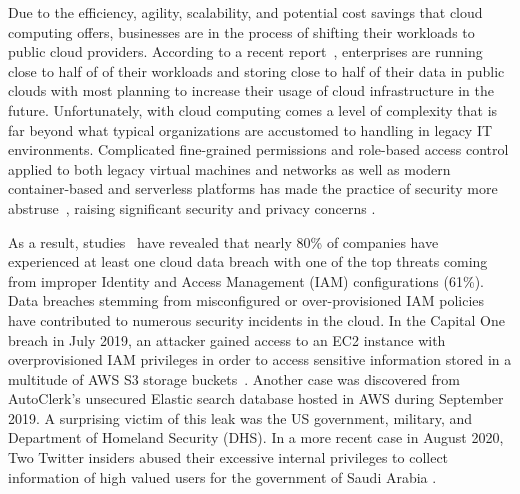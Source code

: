\documentclass[sigconf]{acmart}
\begin{document}
Due to the efficiency, agility, scalability, and potential cost savings that
cloud computing offers, businesses are in the process of shifting their workloads
to public cloud providers. According to a recent report~\cite{Flexera2020}, enterprises are running close to half of of their workloads and storing close to half of their data in public clouds with most planning to increase their usage of cloud infrastructure in the future.
Unfortunately, with cloud computing comes a level of complexity that is far beyond what
typical organizations are accustomed to handling in legacy IT environments.
Complicated fine-grained permissions and role-based access control applied to both legacy 
virtual machines and networks as well as modern container-based and serverless platforms has 
made the practice of security more abstruse~\cite{Sharrm}, raising significant
security and privacy concerns \cite{Takabi2010}.

As a result, studies~\cite{Ermetic2020,IBMSecurity2020} have revealed that nearly 80\% of companies have experienced at least one cloud data breach with one of the top threats
coming from improper Identity and Access Management (IAM) configurations (61\%).
Data breaches stemming from misconfigured or over-provisioned IAM
policies have contributed to numerous security incidents in the cloud.
In the Capital One breach in July 2019, an attacker gained access to an EC2 instance with
overprovisioned IAM privileges in order to access sensitive information stored in a multitude
of AWS S3 storage buckets~\cite{Parimi2019}. 
Another case was discovered from AutoClerk's unsecured Elastic search database hosted in AWS during September 2019. A surprising victim of this leak was the US government, military, and Department of Homeland Security (DHS). \cite{Fawkes2020}
In a more recent case in August 2020, Two Twitter insiders abused their excessive internal privileges to collect information of high valued users for the government of Saudi Arabia \cite{Newman2019}.
\end{document}
